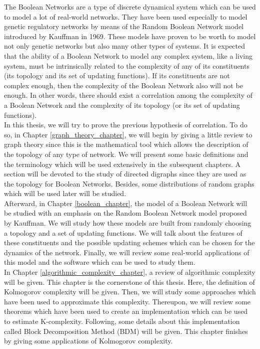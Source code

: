 

The Boolean Networks are a type of discrete dynamical system which can be used to model a lot of real-world networks. They have been used especially to model genetic regulatory networks by means of the Random Boolean Network model introduced by Kauffman in 1969. These models have proven to be worth to model not only genetic networks but also many other types of systems. It is expected that the ability of a Boolean Network to model any complex system, like a living system, must be intrinsically related to the complexity of any of its constituents (its topology and its set of updating functions). If its constituents are not complex enough, then the complexity of the Boolean Network also will not be enough. In other words, there should exist a correlation among the complexity of a Boolean Network and the complexity of its topology (or its set of updating functions).\\

In this thesis, we will try to prove the previous hypothesis of correlation. To do so, in Chapter \ref{graph_theory_chapter}, we will begin by giving a little review to graph theory since this is the mathematical tool which allows the description of the topology of any type of network. We will present some basic definitions and the terminology which will be used extensively in the subsequent chapters. A section will be devoted to the study of directed digraphs since they are used as the topology for Boolean Networks. Besides, some distributions of random graphs which will be used later will be studied.\\

Afterward, in Chapter \ref{boolean_chapter}, the model of a Boolean Network will be studied with an emphasis on the Random Boolean Network model proposed by Kauffman. We will study how these models are built from randomly choosing a topology and a set of updating functions. We will talk about the features of these constituents and the possible updating schemes which can be chosen for the dynamics of the network. Finally, we will review some real-world applications of this model and the software which can be used to study them.\\

In Chapter \ref{algorithmic_complexity_chapter}, a review of algorithmic complexity will be given. This chapter is the cornerstone of this thesis. Here, the definition of Kolmogorov complexity will be given. Then, we will study some approaches which have been used to approximate this complexity. Thereupon, we will review some theorems which have been used to create an implementation which can be used to estimate K-complexity. Following, some details about this implementation called Block Decomposition Method (BDM) will be given. This chapter finishes by giving some applications of Kolmogorov complexity.\\

